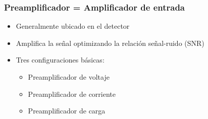 \documentclass{beamer}
\begin{document}
\begin{frame}
\frametitle{Preamplificador = Amplificador de entrada}
\begin{block}{}
\begin{itemize}
\item Generalmente ubicado en el detector
\item Amplifica la señal optimizando la relación señal-ruido (SNR)
\item Tres configuraciones básicas:
\begin{itemize}
\item Preamplificador de voltaje
\item Preamplificador de corriente
\item Preamplificador de carga
\end{itemize}
\end{itemize}
\end{block}
\end{frame}
\end{document}
